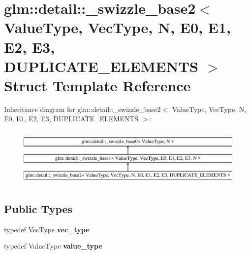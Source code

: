 \hypertarget{structglm_1_1detail_1_1__swizzle__base2}{\section{glm\-:\-:detail\-:\-:\-\_\-swizzle\-\_\-base2$<$ Value\-Type, Vec\-Type, N, E0, E1, E2, E3, D\-U\-P\-L\-I\-C\-A\-T\-E\-\_\-\-E\-L\-E\-M\-E\-N\-T\-S $>$ Struct Template Reference}
\label{structglm_1_1detail_1_1__swizzle__base2}
}
Inheritance diagram for glm\-:\-:detail\-:\-:\-\_\-swizzle\-\_\-base2$<$ Value\-Type, Vec\-Type, N, E0, E1, E2, E3, D\-U\-P\-L\-I\-C\-A\-T\-E\-\_\-\-E\-L\-E\-M\-E\-N\-T\-S $>$\-:\begin{figure}[H]
\begin{center}
\leavevmode
\includegraphics[height=2.906574cm]{structglm_1_1detail_1_1__swizzle__base2}
\end{center}
\end{figure}
\subsection*{Public Types}
\begin{DoxyCompactItemize}
\item 
\hypertarget{structglm_1_1detail_1_1__swizzle__base2_afad8673697b2a4bcbd1de30e49cc2a54}{typedef Vec\-Type {\bfseries vec\-\_\-type}}\label{structglm_1_1detail_1_1__swizzle__base2_afad8673697b2a4bcbd1de30e49cc2a54}

\item 
\hypertarget{structglm_1_1detail_1_1__swizzle__base2_a2b683ea47a63ff7d00943cd55b7c0b02}{typedef Value\-Type {\bfseries value\-\_\-type}}\label{structglm_1_1detail_1_1__swizzle__base2_a2b683ea47a63ff7d00943cd55b7c0b02}

\end{DoxyCompactItemize}
